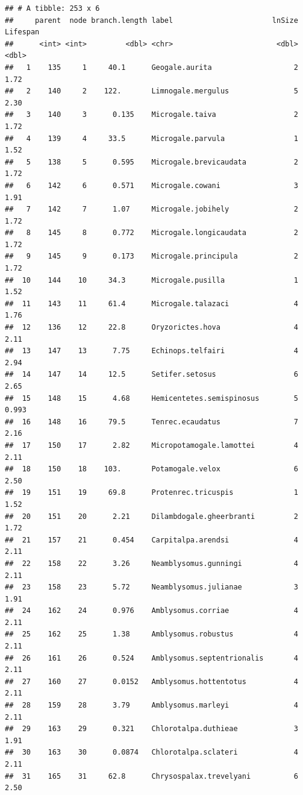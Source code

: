 \documentclass[10pt,letterpaper]{article}
\begin{document}
\begin{verbatim}
## # A tibble: 253 x 6
##     parent  node branch.length label                       lnSize Lifespan
##      <int> <int>         <dbl> <chr>                        <dbl>    <dbl>
##   1    135     1     40.1      Geogale.aurita                   2    1.72 
##   2    140     2    122.       Limnogale.mergulus               5    2.30 
##   3    140     3      0.135    Microgale.taiva                  2    1.72 
##   4    139     4     33.5      Microgale.parvula                1    1.52 
##   5    138     5      0.595    Microgale.brevicaudata           2    1.72 
##   6    142     6      0.571    Microgale.cowani                 3    1.91 
##   7    142     7      1.07     Microgale.jobihely               2    1.72 
##   8    145     8      0.772    Microgale.longicaudata           2    1.72 
##   9    145     9      0.173    Microgale.principula             2    1.72 
##  10    144    10     34.3      Microgale.pusilla                1    1.52 
##  11    143    11     61.4      Microgale.talazaci               4    1.76 
##  12    136    12     22.8      Oryzorictes.hova                 4    2.11 
##  13    147    13      7.75     Echinops.telfairi                4    2.94 
##  14    147    14     12.5      Setifer.setosus                  6    2.65 
##  15    148    15      4.68     Hemicentetes.semispinosus        5    0.993
##  16    148    16     79.5      Tenrec.ecaudatus                 7    2.16 
##  17    150    17      2.82     Micropotamogale.lamottei         4    2.11 
##  18    150    18    103.       Potamogale.velox                 6    2.50 
##  19    151    19     69.8      Protenrec.tricuspis              1    1.52 
##  20    151    20      2.21     Dilambdogale.gheerbranti         2    1.72 
##  21    157    21      0.454    Carpitalpa.arendsi               4    2.11 
##  22    158    22      3.26     Neamblysomus.gunningi            4    2.11 
##  23    158    23      5.72     Neamblysomus.julianae            3    1.91 
##  24    162    24      0.976    Amblysomus.corriae               4    2.11 
##  25    162    25      1.38     Amblysomus.robustus              4    2.11 
##  26    161    26      0.524    Amblysomus.septentrionalis       4    2.11 
##  27    160    27      0.0152   Amblysomus.hottentotus           4    2.11 
##  28    159    28      3.79     Amblysomus.marleyi               4    2.11 
##  29    163    29      0.321    Chlorotalpa.duthieae             3    1.91 
##  30    163    30      0.0874   Chlorotalpa.sclateri             4    2.11 
##  31    165    31     62.8      Chrysospalax.trevelyani          6    2.50 

\end{verbatim}
\end{document}
